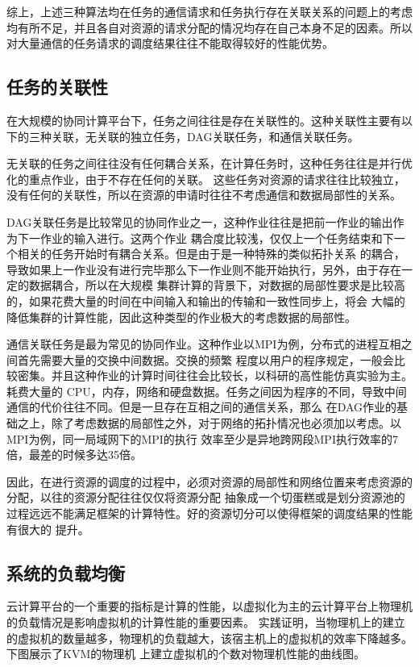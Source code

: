 综上，上述三种算法均在任务的通信请求和任务执行存在关联关系的问题上的考虑均有所不足，并且各自对资源的请求分配的情况均存在自己本身不足的因素。所以对大量通信的任务请求的调度结果往往不能取得较好的性能优势。

\subsection{任务的关联性}
在大规模的协同计算平台下，任务之间往往是存在关联性的。这种关联性主要有以下的三种关联，无关联的独立任务，DAG关联任务，和通信关联任务。

无关联的任务之间往往没有任何耦合关系，在计算任务时，这种任务往往是并行优化的重点作业，由于不存在任何的关联。
这些任务对资源的请求往往比较独立，没有任何的关联性，所以在资源的申请时往往不考虑通信和数据局部性的关系。

DAG关联任务是比较常见的协同作业之一，这种作业往往是把前一作业的输出作为下一作业的输入进行。这两个作业
耦合度比较浅，仅仅上一个任务结束和下一个相关的任务开始时有耦合关系。但是由于是一种特殊的类似拓扑关系
的耦合，导致如果上一作业没有进行完毕那么下一作业则不能开始执行，另外，由于存在一定的数据耦合，所以在大规模
集群计算的背景下，对数据的局部性要求是比较高的，如果花费大量的时间在中间输入和输出的传输和一致性同步上，将会
大幅的降低集群的计算性能，因此这种类型的作业极大的考虑数据的局部性。

通信关联任务是最为常见的协同作业。这种作业以MPI为例，分布式的进程互相之间首先需要大量的交换中间数据。交换的频繁
程度以用户的程序规定，一般会比较密集。并且这种作业的计算时间往往会比较长，以科研的高性能仿真实验为主。耗费大量的
CPU，内存，网络和硬盘数据。任务之间因为程序的不同，导致中间通信的代价往往不同。但是一旦存在互相之间的通信关系，那么
在DAG作业的基础之上，除了考虑数据的局部性之外，对于网络的拓扑情况也必须加以考虑。以MPI为例，同一局域网下的MPI的执行
效率至少是异地跨网段MPI执行效率的7倍，最差的时候多达35倍。

因此，在进行资源的调度的过程中，必须对资源的局部性和网络位置来考虑资源的分配，以往的资源分配往往仅仅将资源分配
抽象成一个切蛋糕或是划分资源池的过程远远不能满足框架的计算特性。好的资源切分可以使得框架的调度结果的性能有很大的
提升。

\subsection{系统的负载均衡}
云计算平台的一个重要的指标是计算的性能，以虚拟化为主的云计算平台上物理机的负载情况是影响虚拟机的计算性能的重要因素。
实践证明，当物理机上的建立的虚拟机的数量越多，物理机的负载越大，该宿主机上的虚拟机的效率下降越多。下图展示了KVM的物理机
上建立虚拟机的个数对物理机性能的曲线图。

